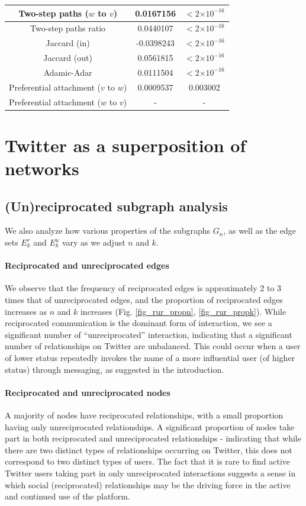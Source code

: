 \documentclass[conference]{IEEEtran}
\providecommand{\e}[1]{\ensuremath{\times 10^{#1}}}
\begin{document}
\begin{table}[!t]
\begin{tabular}{|c||c|c|}
Two-step paths ($w$ to $v$)   &    0.0167156  & $< 2 \e{-16} $\\
\hline
Two-step paths ratio &   0.0440107 & $< 2 \e{-16} $\\
Jaccard (in) & -0.0398243 & $< 2 \e{-16} $\\
Jaccard (out) &   0.0561815  & $< 2 \e{-16} $\\
Adamic-Adar  & 0.0111504 & $< 2 \e{-16} $ \\
Preferential attachment ($v$ to $w$) & 0.0009537 & 0.003002 \\
Preferential attachment ($w$ to $v$)  &  - & -  \\
\hline
\end{tabular}
\end{table}

\section{Twitter as a superposition of networks}

\subsection{(Un)reciprocated subgraph analysis}
We also analyze how various properties of the subgraphs $G_n$, as well as the edge sets $E^r_k$ and $E^u_k$ vary as we adjust $n$ and $k$.

\paragraph*{Reciprocated and unreciprocated edges} We observe that the frequency of reciprocated edges is approximately 2 to 3 times that of unreciprocated edges, and the proportion of reciprocated edges increases as $n$ and $k$ increases (Fig. \ref{fig_rur_propn}, \ref{fig_rur_propk}). 
While reciprocated communication is the dominant form of interaction, we see a significant number of ``unreciprocated'' interaction, indicating that a significant number of relationships on Twitter are unbalanced. 
This could occur when a user of lower status repeatedly invokes
the name of a
more influential user (of higher status) through messaging,
as suggested in the introduction.

\paragraph*{Reciprocated and unreciprocated nodes} A majority of nodes have reciprocated relationships, with a small proportion having only unreciprocated relationships. 
A significant proportion of nodes take part in both reciprocated and unreciprocated relationships - indicating that while there are two distinct types of relationships occurring on Twitter, this does not correspond to two distinct types of users. 
The fact that it is rare to find 
active Twitter users taking part in only unreciprocated interactions
suggests a sense in which 
social (reciprocated) relationships may be the 
driving force in the active and continued use of the platform.
\end{document}

